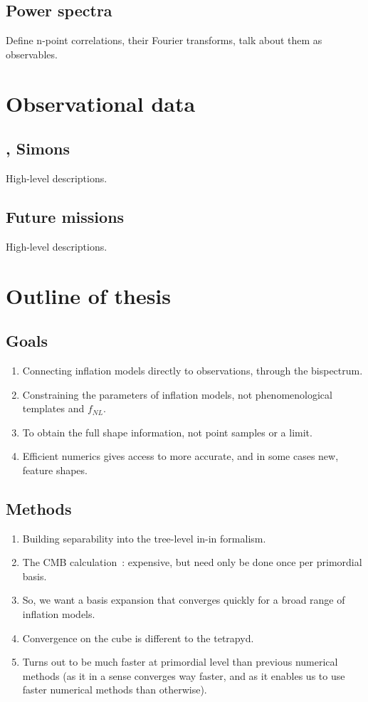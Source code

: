     \subsection{Power spectra}
    Define n-point correlations, their Fourier transforms, talk about them as observables.
\newpage
\section{Observational data}
    \subsection{\planck, Simons} 
    High-level descriptions.
\newpage
    \subsection{Future missions}
    High-level descriptions.
\newpage
\section{Outline of thesis}
    \subsection{Goals}
    \begin{enumerate}
        \item Connecting inflation models directly to observations,
            through the bispectrum.
        \item Constraining the parameters of inflation models, not phenomenological templates and $f_{NL}$.
        \item To obtain the full shape information, not point samples or a limit.
        \item Efficient numerics gives access to more accurate, and in some cases new, feature shapes.
    \end{enumerate}
\newpage
    \subsection{Methods}
    \begin{enumerate}
        \item Building separability into the tree-level in-in formalism.
        \item The CMB calculation~\cite{Sohn_2021}: expensive, but need only be done once per primordial basis.
        \item So, we want a basis expansion that converges quickly for a broad range of inflation models.
        \item Convergence on the cube is different to the tetrapyd.
        \item Turns out to be much faster at primordial level than previous numerical methods
            (as it in a sense converges way faster, and as it enables us to use faster numerical methods than otherwise).
    \end{enumerate}
\newpage
